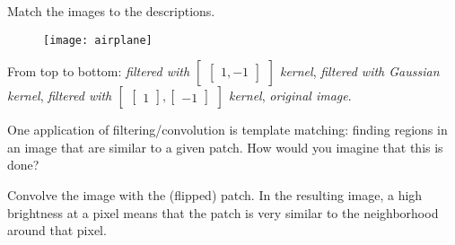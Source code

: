 
\begin{blocksection}
\question Match the images to the descriptions.

\begin{figure}[H]
\texttt{[image: airplane]}
\end{figure}

\begin{solution}[0.75in]
From top to bottom: \textit{filtered with $\begin{bmatrix}\begin{bmatrix}1, -1\end{bmatrix}\end{bmatrix}$ kernel}, \textit{filtered with Gaussian kernel}, \textit{filtered with $\begin{bmatrix}\begin{bmatrix}1\end{bmatrix}, \begin{bmatrix}-1\end{bmatrix}\end{bmatrix}$ kernel}, \textit{original image}.
\end{solution}
\end{blocksection}


\begin{blocksection}
\question One application of filtering/convolution is template matching: finding regions in an image that are similar to a given patch. How would you imagine that this is done?

\begin{solution}[0.75in]
Convolve the image with the (flipped) patch. In the resulting image, a high brightness at a pixel means that the patch is very similar to the neighborhood around that pixel.
\end{solution}
\end{blocksection}


